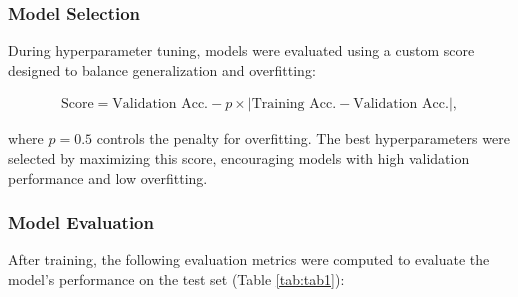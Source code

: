 \subsubsection{Model Selection}

During hyperparameter tuning, models were evaluated using a custom score
designed to balance generalization and overfitting:

\begin{align}
	\text{Score} = \text{Validation Acc.} - p \times \lvert \text{Training Acc.} - \text{Validation Acc.} \rvert,
\end{align}

where \( p = 0.5 \) controls the penalty for overfitting. The best
hyperparameters were selected by maximizing this score, encouraging models with
high validation performance and low overfitting.

\subsubsection{Model Evaluation}

After training, the following evaluation metrics were computed to evaluate the
model's performance on the test set (Table \ref{tab:tab1}):

